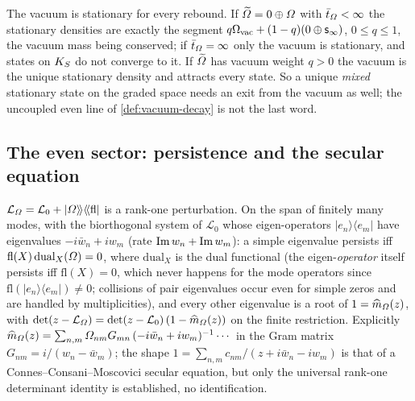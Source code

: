 \begin{proposition}
\label{prop:graded-stationary-segment}
The vacuum is stationary for every rebound. If $\widetilde{\varOmega} = 0\oplus\varOmega$ with
$\bar t_{\varOmega}<\infty$ the stationary densities are exactly the segment $q\Omega_{\mathrm{vac}} + (1-q)(0\oplus
\mathsf s_\infty)$, $0\le q\le1$, the vacuum mass being conserved; if $\bar t_{\varOmega} = \infty$ only the
vacuum is stationary, and states on $K_S$ do not converge to it. If $\widetilde{\varOmega}$ has vacuum
weight $q>0$ the vacuum is the unique stationary density and attracts every state. So a unique
\emph{mixed} stationary state on the graded space needs an exit from the vacuum as well; the
uncoupled even line of \cref{def:vacuum-decay} is not the last word.
\end{proposition}

\subsection{The even sector: persistence and the secular equation}

\begin{proposition}
\label{prop:rebound-persistence-secular}
$\mathcal L_{\varOmega} = \mathcal L_0 + |\varOmega\rangle\!\rangle\langle\!\langle\mathrm{fl}|$ is a rank-one perturbation.
On the span of finitely many modes, with the biorthogonal system of $\mathcal L_0$ whose
eigen-operators $|e_n\rangle\langle e_m|$ have eigenvalues $-i\bar w_n + iw_m$ (rate $\operatorname{Im} w_n+\operatorname{Im} w_m$):
a simple eigenvalue persists iff $\mathrm{fl}(X)\,\mathrm{dual}_X(\varOmega) = 0$, where $\mathrm{dual}_X$ is the dual functional
(the eigen-\emph{operator} itself persists iff $\mathrm{fl}(X) = 0$, which never happens for the mode
operators since $\mathrm{fl}(|e_n\rangle\langle e_m|)\ne0$; collisions of pair eigenvalues occur even for simple
zeros and are handled by multiplicities), and every other eigenvalue is a root of $1 =
\widehat m_{\varOmega}(z)$, with $\det(z-\mathcal L_{\varOmega}) = \det(z-\mathcal L_0)\,(1-\widehat m_{\varOmega}(z))$
on the finite restriction. Explicitly $\widehat m_{\varOmega}(z) = \sum_{n,m}\varOmega_{nm}G_{mn}\,
(-i\bar w_n+iw_m)^{-1}\cdots$ in the Gram matrix $G_{nm} = i/(w_n-\bar w_m)$; the shape
$1 = \sum_{n,m}c_{nm}/(z+i\bar w_n-iw_m)$ is that of a Connes--Consani--Moscovici secular equation,
but only the universal rank-one determinant identity is established, no identification.
\end{proposition}

